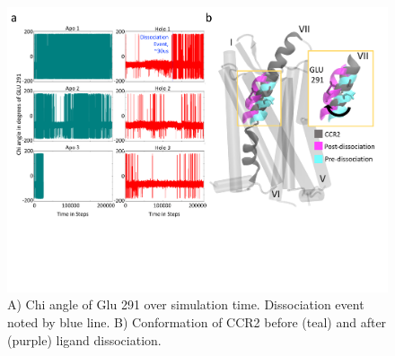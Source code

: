 \begin{figure}[htbp]
  \begin{center}
  \includegraphics[width=\textwidth]{./figures/state35_glu291_larger.png}
 \caption[Dihedral angles of Glu 291 over time]{A) Chi angle of Glu 291 over simulation time. Dissociation event noted by blue line. B) Conformation of CCR2 before (teal) and after (purple) ligand dissociation.}
  \label{fig:state35_glu291}
\end{center}
\end{figure}

